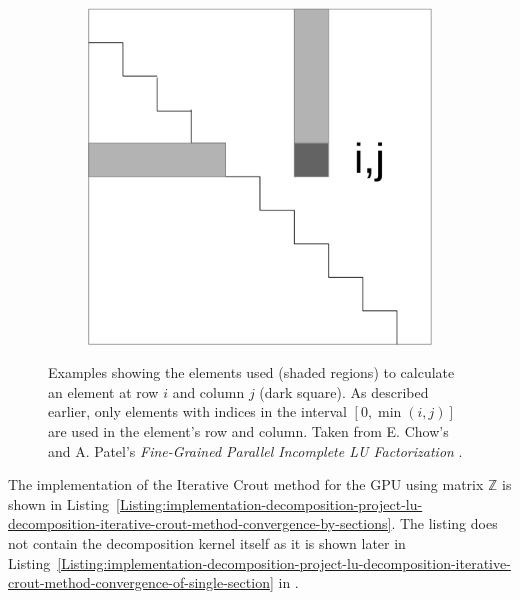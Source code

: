 \begin{figure}[ht!]
\begin{subfigure}{.5\textwidth}
		\includegraphics[width=.8\textwidth, keepaspectratio]{images/ch2/LU_decomposition_crout_method_visualization_elements_used_simple_upper.png}
		\label{Figure:implementation-decomposition-project-lu-decomposition-element-dependance-upper}
	\end{subfigure}
	\caption{Examples showing the elements used (shaded regions) to calculate an element at row $ i $ and column $ j $ (dark square). As described earlier, only elements with indices in the interval $ \left[0, \min(i, j)\right] $ are used in the element's row and column. Taken from E. Chow's and A. Patel's \emph{Fine-Grained Parallel Incomplete LU Factorization} \cite{Chow2015}.}
	\label{Figure:implementation-decomposition-project-lu-decomposition-element-dependance}
\end{figure}

The implementation of the Iterative Crout method for the GPU using matrix $ \mathbb{Z} $ is shown in Listing~\ref{Listing:implementation-decomposition-project-lu-decomposition-iterative-crout-method-convergence-by-sections}. The listing does not contain the decomposition kernel itself as it is shown later in Listing~\ref{Listing:implementation-decomposition-project-lu-decomposition-iterative-crout-method-convergence-of-single-section} in \textit{}.

